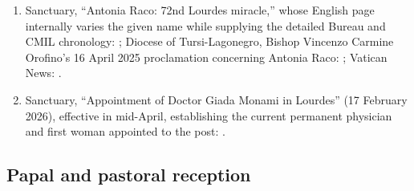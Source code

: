 \begin{enumerate}
  \item Sanctuary, “Antonia Raco: 72nd Lourdes miracle,” whose English page internally varies the given name while supplying the detailed Bureau and CMIL chronology: ; Diocese of Tursi-Lagonegro, Bishop Vincenzo Carmine Orofino's 16 April 2025 proclamation concerning Antonia Raco: ; Vatican News: .
  \item Sanctuary, “Appointment of Doctor Giada Monami in Lourdes” (17 February 2026), effective in mid-April, establishing the current permanent physician and first woman appointed to the post: .
\end{enumerate}

\subsection{Papal and pastoral reception}

